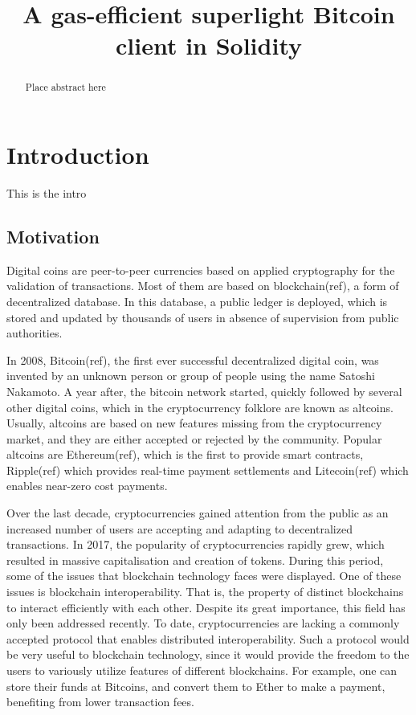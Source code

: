 \documentclass{article}
\title{A gas-efficient superlight Bitcoin client in Solidity}
\begin{document}
\maketitle

\begin{abstract}
Place abstract here
\end{abstract}

\section{Introduction}
This is the intro
\subsection{Motivation}

Digital coins are peer-to-peer currencies based on applied cryptography for the
validation of transactions. Most of them are based on blockchain(ref), a form
of decentralized database. In this database, a public ledger is deployed, which
is stored and updated by thousands of users in absence of supervision from
public authorities.

In 2008, Bitcoin(ref), the first ever successful decentralized digital coin,
was invented by an unknown person or group of people using the name Satoshi
Nakamoto. A year after, the bitcoin network started, quickly followed by
several other digital coins, which in the cryptocurrency folklore are known as
altcoins. Usually, altcoins are based on new features missing from the
cryptocurrency market, and they are either accepted or rejected by the
community. Popular altcoins are Ethereum(ref), which is the first to provide
smart contracts, Ripple(ref) which provides real-time payment settlements and
Litecoin(ref) which enables near-zero cost payments.

Over the last decade, cryptocurrencies gained attention from the public as an
increased number of users are accepting and adapting to decentralized
transactions. In 2017, the popularity of cryptocurrencies rapidly grew, which
resulted in massive capitalisation and creation of tokens. During this period,
some of the issues that blockchain technology faces were displayed. One of
these issues is blockchain interoperability. That is, the property of
distinct blockchains to interact efficiently with each other. Despite its great
importance, this field has only been addressed recently. To date,
cryptocurrencies are lacking a commonly accepted protocol that enables
distributed interoperability. Such a protocol would be very useful to
blockchain technology, since it would provide the freedom to the users to
variously utilize features of different blockchains. For example, one can store
their funds at Bitcoins, and convert them to Ether to make a payment,
benefiting from lower transaction fees.
\end{document}
